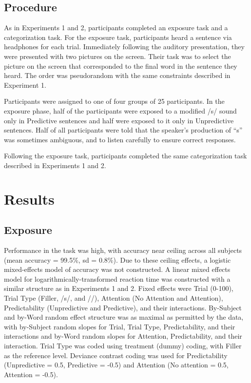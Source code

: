 \subsection{Procedure}

As in Experiments 1 and 2, participants completed an exposure task and a categorization task.  
For the exposure task, participants heard a sentence via headphones for each trial.  
Immediately following the auditory presentation, they were presented with two pictures on the screen.  
Their task was to select the picture on the screen that corresponded to the final word in the sentence they heard.  
The order was pseudorandom with the same constraints described in Experiment 1.

Participants were assigned to one of four groups of 25 participants.  
In the exposure phase, half of the participants were exposed to a modified /s/ sound only in Predictive sentences and half were exposed to it only in Unpredictive sentences.  
Half of all participants were told that the speaker's production of ``s'' was sometimes ambiguous, and to listen carefully to ensure correct responses.  

Following the exposure task, participants completed the same categorization task described in Experiments 1 and 2.

\section{Results}

\subsection{Exposure}

Performance in the task was high, with accuracy near ceiling across all subjects (mean accuracy = 99.5\%, sd = 0.8\%).
Due to these ceiling effects, a logistic mixed-effects model of accuracy was not constructed.  
A linear mixed effects model for logarithmically-transformed reaction time was constructed with a similar structure as in Experiments 1 and 2.
Fixed effects were Trial (0-100), Trial Type (Filler, /s/, and /\textesh/), Attention (No Attention and Attention), Predictability (Unpredictive and Predictive), and their interactions.  
By-Subject and by-Word random effect structure was as maximal as permitted by the data, with by-Subject random slopes for Trial, Trial Type, Predictability, and their interactions and by-Word random slopes for Attention, Predictability, and their interaction. 
Trial Type was coded using treatment (dummy) coding, with Filler as the reference level. 
Deviance contrast coding was used for Predictability (Unpredictive = 0.5, Predictive = -0.5) and Attention (No attention = 0.5, Attention = -0.5).

